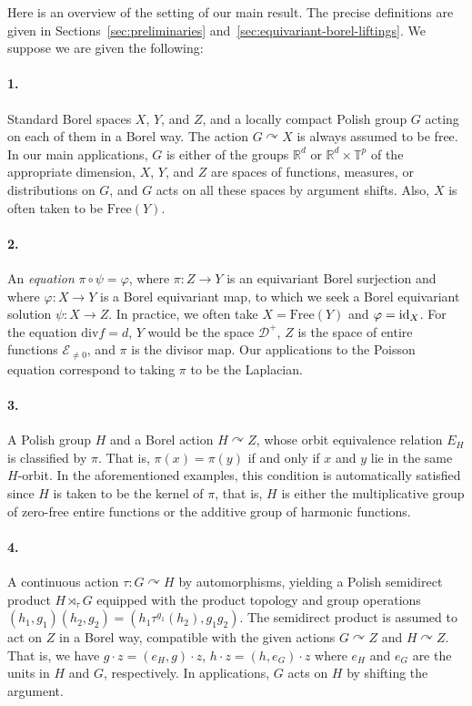 \documentclass[12pt]{paper}
\numberwithin{equation}{section}
\theoremstyle{plain}
\theoremstyle{definition}
\newcommand{\Rd}{\mathbb{R}^{d}}
\newcommand{\T}{\mathbb{T}}
\newcommand{\holom}[1][]{\mathcal{E}_{#1}}
\newcommand{\divis}[1][]{\mathcal{D}_{#1}}
\newcommand{\divisp}[1][]{\divis[#1]^{+}}
\newcommand{\dm}{\mathrm{div}}      %
\newcommand{\acts}{\curvearrowright}
\newcommand{\free}{\mathrm{Free}}
\renewcommand{\phi}{\varphi}
\begin{document}
Here is an overview of the setting of our main result. The precise definitions are given in
Sections~\ref{sec:preliminaries} and~\ref{sec:equivariant-borel-liftings}.  We suppose we are given
the following:

\paragraph{1.} Standard Borel spaces \(X\), \(Y\), and \(Z\), and a locally compact Polish group
\(G\) acting on each of them in a Borel way.  The action \(G\acts X\) is always assumed to be free.
In our main applications, \(G\) is either of the groups \(\Rd\) or \(\Rd\times \T^p\) of the
appropriate dimension, \(X\), \(Y\), and \(Z\) are spaces of functions, measures, or distributions on
\(G\), and \(G\) acts on all these spaces by argument shifts.  Also, \(X\) is often taken to be
\(\free(Y)\).

\paragraph{2.} An \emph{equation} \(\pi\circ\psi=\phi\), where \(\pi:Z\to Y\) is an equivariant Borel
surjection and where \(\phi:X\to Y\) is a Borel equivariant map, to which we seek a Borel
equivariant solution \(\psi:X\to Z\). In practice, we often take \(X=\free(Y)\) and
\(\phi={\rm id}_X\). For the equation \(\dm f=d\), \(Y\) would be the space \(\divisp\), \(Z\) is
the space of entire functions \(\holom[\ne 0]\), and \(\pi\) is the divisor map.  Our applications
to the Poisson equation correspond to taking \(\pi\) to be the Laplacian.

\paragraph{3.} A Polish group \(H\) and a Borel action \(H\acts Z\), whose orbit equivalence
relation \(E_H\) is classified by \(\pi\). That is, \(\pi(x)=\pi(y)\) if and only if \(x\) and \(y\)
lie in the same \(H\)-orbit.  In the aforementioned examples, this condition is automatically
satisfied since \(H\) is taken to be the kernel of \(\pi\), that is, \(H\) is either the
multiplicative group of zero-free entire functions or the additive group of harmonic functions.

\paragraph{4.} A continuous action \(\tau : G \acts H\) by automorphisms, yielding a Polish
semidirect product \(H \rtimes_{\tau} G\) equipped with the product topology and group operations
\((h_{1},g_{1})(h_{2},g_{2}) = (h_{1}\tau^{g_{1}}(h_{2}), g_{1}g_{2})\). The semidirect product is
assumed to act on \(Z\) in a Borel way, compatible with the given actions \(G\acts Z\) and
\(H\acts Z\).  That is, we have \(g\cdot z=(e_H, g)\cdot z\), \(h\cdot z=(h, e_G)\cdot z\) where
\(e_H\) and \(e_G\) are the units in \(H\) and \(G\), respectively.  In applications, \(G\) acts on
\(H\) by shifting the argument.
\end{document}
